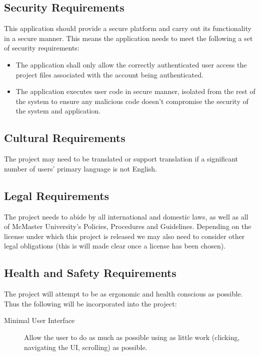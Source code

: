\documentclass[12pt, titlepage]{article}
\begin{document}
  \subsection{Security Requirements}
  This application should provide a secure platform and carry out its
  functionality in a secure manner. This means the application needs to meet
  the following a set of security requirements:
  \begin{itemize}
    \item The application shall only allow the correctly authenticated user
      access the project files associated with the account being authenticated.
    \item The application executes user code in secure manner, isolated from
      the rest of the system to ensure any malicious code doesn't compromise
      the security of the system and application.
  \end{itemize}

  \subsection{Cultural Requirements}
  The project may need to be translated or support translation if a significant
  number of users' primary language is not English.

  \subsection{Legal Requirements}
	The project needs to abide by all international and domestic laws, as well as
	all of McMaster University's Policies, Procedures and Guidelines. Depending
	on the license under which this project is released we may also need to
	consider other legal obligations (this is will made clear once a license has
	been chosen).

  \subsection{Health and Safety Requirements}
	The project will attempt to be as ergonomic and health conscious as possible.
	Thus the following will be incorporated into the project:
	\begin{description}
		\item [Minimal User Interface] Allow the user to do as much as possible
			using as little work (clicking, navigating the UI, scrolling) as
			possible.
	\end{description}
\end{document}
